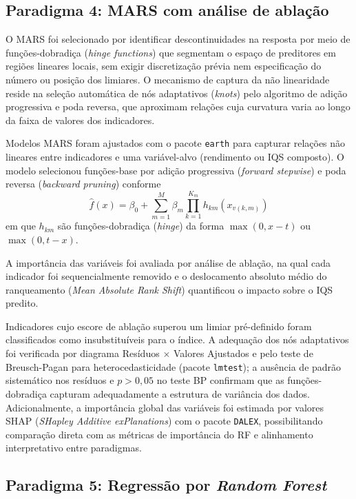 \documentclass[pdflatex,sn-basic]{sn-jnl}%
\begin{document}
\subsection{Paradigma 4: MARS com análise de ablação}\label{subsec:mars}

O MARS foi selecionado por identificar descontinuidades na resposta por meio de funções-dobradiça (\textit{hinge functions}) que segmentam o espaço de preditores em regiões lineares locais, sem exigir discretização prévia nem especificação do número ou posição dos limiares. O mecanismo de captura da não linearidade reside na seleção automática de nós adaptativos (\textit{knots}) pelo algoritmo de adição progressiva e poda reversa, que aproximam relações cuja curvatura varia ao longo da faixa de valores dos indicadores.

Modelos MARS \citep{Friedman1991} foram ajustados com o pacote \texttt{earth} \citep{Milborrow2023} para capturar relações não lineares entre indicadores e uma variável-alvo (rendimento ou IQS composto). O modelo selecionou funções-base por adição progressiva (\textit{forward stepwise}) e poda reversa (\textit{backward pruning}) conforme
\begin{equation}
\hat{f}(x) = \beta_0 + \sum_{m=1}^{M} \beta_m \prod_{k=1}^{K_m} h_{km}(x_{v(k,m)})
\label{eq:mars}
\end{equation}
em que $h_{km}$ são funções-dobradiça (\textit{hinge}) da forma $\max(0, x - t)$ ou $\max(0, t - x)$.

A importância das variáveis foi avaliada por análise de ablação, na qual cada indicador foi sequencialmente removido e o deslocamento absoluto médio do ranqueamento (\textit{Mean Absolute Rank Shift}) quantificou o impacto sobre o IQS predito. 

Indicadores cujo escore de ablação superou um limiar pré-definido foram classificados como insubstituíveis para o índice. A adequação dos nós adaptativos foi verificada por diagrama Resíduos $\times$ Valores Ajustados e pelo teste de Breusch-Pagan para heterocedasticidade (pacote \texttt{lmtest}); a ausência de padrão sistemático nos resíduos e $p > 0{,}05$ no teste BP confirmam que as funções-dobradiça capturam adequadamente a estrutura de variância dos dados. Adicionalmente, a importância global das variáveis foi estimada por valores SHAP (\textit{SHapley Additive exPlanations}) com o pacote \texttt{DALEX}, possibilitando comparação direta com as métricas de importância do RF e alinhamento interpretativo entre paradigmas.

\subsection{Paradigma 5: Regressão por \textit{Random Forest}}\label{subsec:rf}
\end{document}
